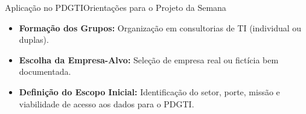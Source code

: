 \begin{senaiframe}{Aplicação no PDGTI}{Orientações para o Projeto da Semana}
  \vspace{0.5cm}
  \begin{tcolorbox}[senaigreencard, title={Atividades Práticas da Semana 1}]
    \begin{itemize}
      \item \textbf{Formação dos Grupos:} Organização em consultorias de TI (individual ou duplas).
      \item \textbf{Escolha da Empresa-Alvo:} Seleção de empresa real ou fictícia bem documentada.
      \item \textbf{Definição do Escopo Inicial:} Identificação do setor, porte, missão e viabilidade de acesso aos dados para o PDGTI.
    \end{itemize}
  \end{tcolorbox}
\end{senaiframe}
